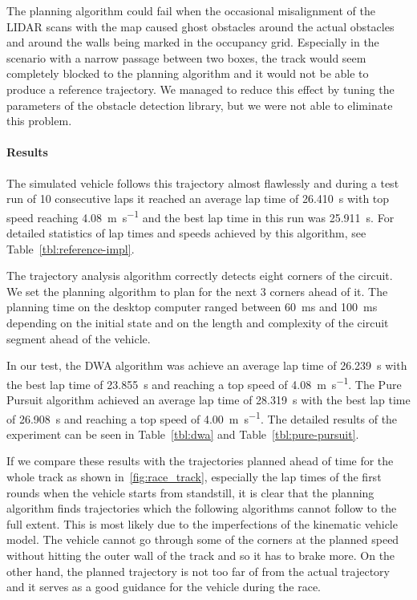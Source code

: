 The planning algorithm could fail when the occasional misalignment of the \gls*{LIDAR} scans with the map caused ghost obstacles around the actual obstacles and around the walls being marked in the occupancy grid. Especially in the scenario with a narrow passage between two boxes, the track would seem completely blocked to the planning algorithm and it would not be able to produce a reference trajectory. We managed to reduce this effect by tuning the parameters of the obstacle detection library, but we were not able to eliminate this problem.

\paragraph{Results}

The simulated vehicle follows this trajectory almost flawlessly and during a test run of 10 consecutive laps it reached an average lap time of \SI{26.410}{\second} with top speed reaching \SI{4.08}{\meter\per\second} and the best lap time in this run was \SI{25.911}{\second}. For detailed statistics of lap times and speeds achieved by this algorithm, see Table~\ref{tbl:reference-impl}.

The trajectory analysis algorithm correctly detects eight corners of the circuit. We set the planning algorithm to plan for the next 3 corners ahead of it. The planning time on the desktop computer ranged between \SI{60}{\milli\second} and \SI{100}{\milli\second} depending on the initial state and on the length and complexity of the circuit segment ahead of the vehicle.

In our test, the \gls*{DWA} algorithm was achieve an average lap time of \SI{26.239}{\s} with the best lap time of \SI{23.855}{\s} and reaching a top speed of \SI{4.08}{\meter\per\second}. The Pure Pursuit algorithm achieved an average lap time of \SI{28.319}{\s} with the best lap time of \SI{26.908}{\s} and reaching a top speed of \SI{4.00}{\meter\per\second}. The detailed results of the experiment can be seen in Table~\ref{tbl:dwa} and Table~\ref{tbl:pure-pursuit}.

If we compare these results with the trajectories planned ahead of time for the whole track as shown in~\ref{fig:race_track}, especially the lap times of the first rounds when the vehicle starts from standstill, it is clear that the planning algorithm finds trajectories which the following algorithms cannot follow to the full extent. This is most likely due to the imperfections of the kinematic vehicle model. The vehicle cannot go through some of the corners at the planned speed without hitting the outer wall of the track and so it has to brake more. On the other hand, the planned trajectory is not too far of from the actual trajectory and it serves as a good guidance for the vehicle during the race.

